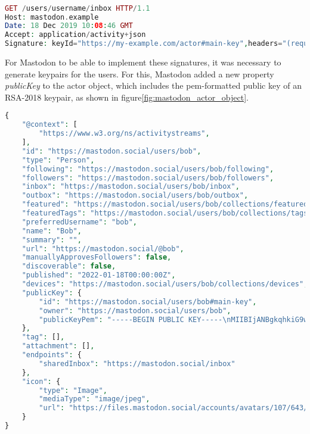 \lstset{style=JSONStyle}
\begin{lstlisting}[language=PHP, caption=Signed HTTP Request, label=fig:http_signature, float=h]

GET /users/username/inbox HTTP/1.1
Host: mastodon.example
Date: 18 Dec 2019 10:08:46 GMT
Accept: application/activity+json
Signature: keyId="https://my-example.com/actor#main-key",headers="(request-target) host date",signature="Y2FiYW...IxNGRiZDk4ZA=="

\end{lstlisting}

For Mastodon to be able to implement these signatures, it was necessary to generate keypairs for the users. For this, Mastodon added a new property \emph{publicKey} to the actor object, which includes the pem-formatted public key of an RSA-2018 keypair, as shown in figure\ref{fig:mastodon_actor_object}.

\lstset{style=JSONStyle}
\begin{lstlisting}[language=PHP, caption=Mastodon extended version of ActivityPub's actor object, label=fig:mastodon_actor_object, float=ht]
{
    "@context": [
        "https://www.w3.org/ns/activitystreams",
    ],
    "id": "https://mastodon.social/users/bob",
    "type": "Person",
    "following": "https://mastodon.social/users/bob/following",
    "followers": "https://mastodon.social/users/bob/followers",
    "inbox": "https://mastodon.social/users/bob/inbox",
    "outbox": "https://mastodon.social/users/bob/outbox",
    "featured": "https://mastodon.social/users/bob/collections/featured",
    "featuredTags": "https://mastodon.social/users/bob/collections/tags",
    "preferredUsername": "bob",
    "name": "Bob",
    "summary": "",
    "url": "https://mastodon.social/@bob",
    "manuallyApprovesFollowers": false,
    "discoverable": false,
    "published": "2022-01-18T00:00:00Z",
    "devices": "https://mastodon.social/users/bob/collections/devices",
    "publicKey": {
        "id": "https://mastodon.social/users/bob#main-key",
        "owner": "https://mastodon.social/users/bob",
        "publicKeyPem": "-----BEGIN PUBLIC KEY-----\nMIIBIjANBgkqhkiG9w0BAQEFAAOCAQ8AMIIBCgKCAQEAuWWHabkb/1v/OtK3x3EJ\nvxVaHwwN0PxTbOT/UsDNhu8GynBA2A371rg+BEUFGE/yQ6ljaDcqiQtaAMnuvOpT\nLRUOXu5O5Ct+qBWoLb+Box2NkSWJWc4rP+FXEHM+PTPqJJEplZSKIboCjLijw90V\nCD0hL6nBdXSnNp3CeaiDJfjXx+8MoR7xm4AB4Av0nrrM/eGBd60UM3EqMUVAWYtN\n813hrCmbapi++KY9DE7QpMPUoyOiarvFtl8JpV9HWJ1FrwloT17jJ02smPoCy6iv\nQgDXcAWnMm2PZWuSh/uQ7Y6Iq1ZSCkdQJQwaNsyB6O4BlyPujU2f2wg4nzf5QaBn\nwQIDAQAB\n-----END PUBLIC KEY-----\n"
    },
    "tag": [],
    "attachment": [],
    "endpoints": {
        "sharedInbox": "https://mastodon.social/inbox"
    },
    "icon": {
        "type": "Image",
        "mediaType": "image/jpeg",
        "url": "https://files.mastodon.social/accounts/avatars/107/643/267/140/999/130/original/557f01fa567f8220.jpg"
    }
}
\end{lstlisting}

